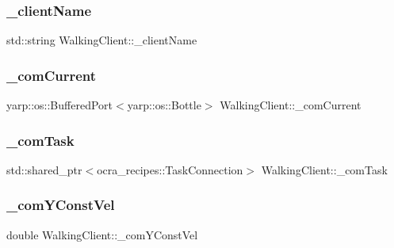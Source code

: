 \subsubsection{\texorpdfstring{\+\_\+client\+Name}{\_clientName}}
{\footnotesize\ttfamily std\+::string Walking\+Client\+::\+\_\+client\+Name\hspace{0.3cm}{\ttfamily [private]}}

\hypertarget{classWalkingClient_a199a104e0d4d52deae07d88d8229b60d}{}\label{classWalkingClient_a199a104e0d4d52deae07d88d8229b60d} 
\subsubsection{\texorpdfstring{\+\_\+com\+Current}{\_comCurrent}}
{\footnotesize\ttfamily yarp\+::os\+::\+Buffered\+Port$<$yarp\+::os\+::\+Bottle$>$ Walking\+Client\+::\+\_\+com\+Current\hspace{0.3cm}{\ttfamily [private]}}

\hypertarget{classWalkingClient_aa798d6193535e80816f8107ee5fb2172}{}\label{classWalkingClient_aa798d6193535e80816f8107ee5fb2172} 
\subsubsection{\texorpdfstring{\+\_\+com\+Task}{\_comTask}}
{\footnotesize\ttfamily std\+::shared\+\_\+ptr$<$ocra\+\_\+recipes\+::\+Task\+Connection$>$ Walking\+Client\+::\+\_\+com\+Task\hspace{0.3cm}{\ttfamily [private]}}

\hypertarget{classWalkingClient_a4e448bc147b41d97e0f17af6ebb0020f}{}\label{classWalkingClient_a4e448bc147b41d97e0f17af6ebb0020f} 
\subsubsection{\texorpdfstring{\+\_\+com\+Y\+Const\+Vel}{\_comYConstVel}}
{\footnotesize\ttfamily double Walking\+Client\+::\+\_\+com\+Y\+Const\+Vel\hspace{0.3cm}{\ttfamily [private]}}

